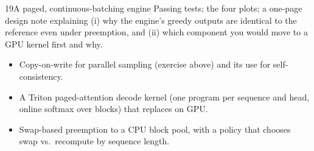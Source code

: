\begin{labbox}{19}{A paged, continuous-batching engine}
Passing tests; the four plots; a one-page design note explaining (i) why the engine's greedy outputs
are identical to the reference even under preemption, and (ii) which component you would move to a GPU
kernel first and why.

\begin{itemize}
  \item Copy-on-write  for parallel sampling (exercise above) and its use for self-consistency.
  \item A Triton paged-attention decode kernel (one program per sequence and head, online softmax over
    blocks) that replaces  on GPU.
  \item Swap-based preemption to a CPU block pool, with a policy that chooses swap vs.\ recompute by
    sequence length.
\end{itemize}
\end{labbox}
